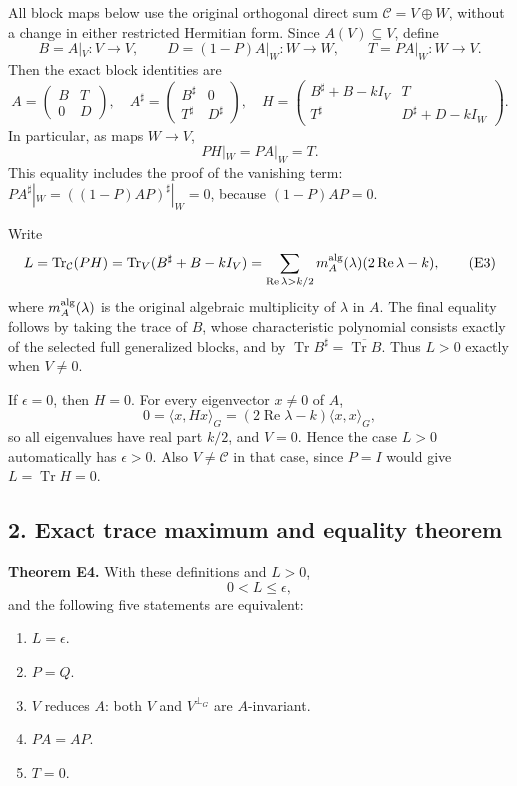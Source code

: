 All block maps below use the original orthogonal direct sum \(\mathcal C=V\oplus W\), without a change in either restricted Hermitian form. Since \(A(V)\subseteq V\), define
\[
B=A|_V:V\longrightarrow V,\qquad
D=(1-P)A|_W:W\longrightarrow W,\qquad
T=PA|_W:W\longrightarrow V.
\]
Then the exact block identities are
\[
A=\begin{pmatrix}B&T\\0&D\end{pmatrix},\quad
A^\sharp=\begin{pmatrix}B^\sharp&0\\T^\sharp&D^\sharp\end{pmatrix},\quad
H=\begin{pmatrix}B^\sharp+B-kI_V&T\\T^\sharp&D^\sharp+D-kI_W\end{pmatrix}.
\tag{E1}
\]
In particular, as maps \(W\to V\),
\[
PH|_W=PA|_W=T.
\tag{E2}
\]
This equality includes the proof of the vanishing term: \(PA^\sharp|_W=((1-P)AP)^\sharp|_W=0\), because \((1-P)AP=0\).

Write
\[
L=\operatorname{Tr}_{\mathcal C}(PH)
 =\operatorname{Tr}_V(B^\sharp+B-kI_V)
 =\sum_{\operatorname{Re}\lambda>k/2}m_A^{\rm alg}(\lambda)(2\operatorname{Re}\lambda-k),
\tag{E3}
\]
where \(m_A^{\rm alg}(\lambda)\) is the original algebraic multiplicity of \(\lambda\) in \(A\). The final equality follows by taking the trace of \(B\), whose characteristic polynomial consists exactly of the selected full generalized blocks, and by \(\operatorname{Tr}B^\sharp=\overline{\operatorname{Tr}B}\). Thus \(L>0\) exactly when \(V\ne0\).

If \(\epsilon=0\), then \(H=0\). For every eigenvector \(x\ne0\) of \(A\),
\[
0=\langle x,Hx\rangle_G=(2\operatorname{Re}\lambda-k)\langle x,x\rangle_G,
\]
so all eigenvalues have real part \(k/2\), and \(V=0\). Hence the case \(L>0\) automatically has \(\epsilon>0\). Also \(V\ne\mathcal C\) in that case, since \(P=I\) would give \(L=\operatorname{Tr}H=0\).

\subsection{2. Exact trace maximum and equality theorem}\label{exact-trace-maximum-and-equality-theorem}

\textbf{Theorem E4.} With these definitions and \(L>0\),
\[
0<L\leq\epsilon,
\]
and the following five statements are equivalent:

\begin{enumerate}
\def\labelenumi{\arabic{enumi}.}
\tightlist
\item
  \(L=\epsilon\).
\item
  \(P=Q\).
\item
  \(V\) reduces \(A\): both \(V\) and \(V^{\perp_G}\) are \(A\)-invariant.
\item
  \(PA=AP\).
\item
  \(T=0\).
\end{enumerate}

